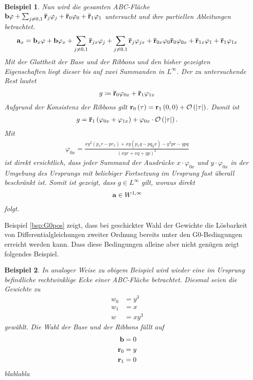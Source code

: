 \documentclass[10pt,a4paper,oneside]{report}
\newtheorem{beispiel}{Beispiel}[chapter]
\begin{document}
\begin{beispiel}
Nun wird die gesamten ABC-Fläche $\bold{b} \varphi + \sum_{j\neq 0,1} \bold{\bar{r}}_j \varphi_j + \bold{\bar{r}}_0 \varphi_0 + \bold{\bar{r}}_1 \varphi_1$ untersucht und ihre partiellen Ableitungen betrachtet.
\begin{align*}
\bold{a}_x = \bold{b}_x \varphi + \bold{b} \varphi_x + \sum_{j\neq 0,1} \bold{\bar{r}}_{jx} \varphi_j + \sum_{j\neq 0,1} \bold{\bar{r}}_j \varphi_{jx} + \bold{\bar{r}}_{0x} \varphi_0 \bold{\bar{r}}_{0} \varphi_{0x}+ \bold{\bar{r}}_{1x} \varphi_1 + \bold{\bar{r}}_{1} \varphi_{1x} 
\end{align*}
Mit der Glattheit der Base und der Ribbons und den bisher gezeigten Eigenschaften liegt dieser bis auf zwei Summanden in $L^{\infty}$.
Der zu untersuchende Rest lautet
\begin{align*}
g \coloneqq \bold{\bar{r}}_{0} \varphi_{0x} + \bold{\bar{r}}_{1} \varphi_{1x}
\end{align*}
Aufgrund der Konsistenz der Ribbons gilt $\bold{r}_0 \left(\tau\right) = \bold{r}_1 \left(0,0\right) + \mathcal{O} \left( \left| \tau \right| \right)$.
Damit ist
\begin{align*}
g = \bold{\bar{r}}_{1} \left( \varphi_{0x} + \varphi_{1x} \right) + \varphi_{0x} \cdot \mathcal{O} \left( \left| \tau \right| \right).
\end{align*}
Mit  
\begin{align*}
\varphi_{0x} = \frac{x y^2 \left( p_xr- p r_x\right) + xy \left(p_x q -p q_yx\right) - y^2 pr - ypq}{\left(xy r + x q+ y p \right)^2}
\end{align*}
ist direkt ersichtlich, dass jeder Summand der Ausdrücke $x \cdot \varphi_{0x}$ und $y \cdot \varphi_{0x}$ in der Umgebung des Ursprungs mit beliebiger Fortsetzung im Ursprung fast überall beschränkt ist. 
Somit ist gezeigt, dass $g \in L^{\infty}$ gilt, woraus direkt
\begin{align*}
\bold{a} \in W^{1,\infty}
\end{align*}
folgt.
\end{beispiel}

Beispiel \ref{bsp:G0pos} zeigt, dass bei geschickter Wahl der Gewichte die Lösbarkeit von Differentialgleichungen zweiter Ordnung bereits unter den G0-Bedingungen erreicht werden kann.
Dass diese Bedingungen alleine aber nicht genügen zeigt folgendes Beispiel.

\begin{beispiel}
In analoger Weise zu obigem Beispiel wird wieder eine im Ursprung befindliche rechtwinklige Ecke einer ABC-Fläche betrachtet.
Diesmal seien die Gewichte zu
\begin{align*}
w_0 &= y^3 \\
w_1 &= x \\
w &= xy^3
\end{align*}
gewählt.
Die Wahl der Base und der Ribbons fällt auf 
\begin{align*}
\bold{b} &= 0 \\
\bold{r}_0 &= y \\
\bold{r}_1 &= 0 
\end{align*}
blablabla
\end{beispiel}
\end{document}
